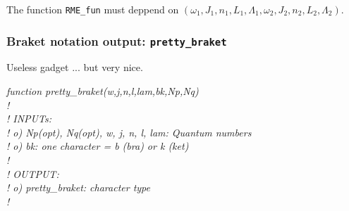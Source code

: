 \documentclass[english,twoside, openright]{report}
\begin{document}
  The function \texttt{RME\_fun} must deppend on
  $\left(\omega_1,J_1,n_1,L_1,\Lambda_1,\omega_2,J_2,n_2,L_2,\Lambda_2\right)$.

  \subsubsection{Braket notation output: \texttt{pretty\_braket}}
  
  Useless gadget ... but very nice.

  \vbox{\em
    function pretty\_braket(w,j,n,l,lam,bk,Np,Nq) \\
    ! \\
    ! INPUTs:\\
    !        o) Np(opt), Nq(opt), w, j, n, l, lam: Quantum numbers \\
    !        o) bk: one character = b (bra) or k (ket) \\
    !\\
    ! OUTPUT: \\
    !        o) pretty\_braket: character type \\
    ! \\
  }
\end{document}

